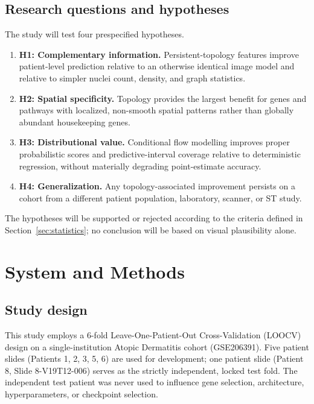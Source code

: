 \documentclass[nocrop]{bioinfo}
\begin{document}
\subsection{Research questions and hypotheses}

The study will test four prespecified hypotheses.

\begin{enumerate}
\item \textbf{H1: Complementary information.} Persistent-topology features
improve patient-level prediction relative to an otherwise identical image
model and relative to simpler nuclei count, density, and graph statistics.

\item \textbf{H2: Spatial specificity.} Topology provides the largest benefit
for genes and pathways with localized, non-smooth spatial patterns rather
than globally abundant housekeeping genes.

\item \textbf{H3: Distributional value.} Conditional flow modelling improves
proper probabilistic scores and predictive-interval coverage relative to
deterministic regression, without materially degrading point-estimate
accuracy.

\item \textbf{H4: Generalization.} Any topology-associated improvement
persists on a cohort from a different patient population, laboratory,
scanner, or ST study.
\end{enumerate}

The hypotheses will be supported or rejected according to the criteria
defined in Section~\ref{sec:statistics}; no conclusion will be based on visual
plausibility alone.

\section{System and Methods}

\subsection{Study design}

This study employs a 6-fold Leave-One-Patient-Out Cross-Validation (LOOCV) design on a single-institution Atopic Dermatitis cohort (GSE206391). Five patient slides (Patients 1, 2, 3, 5, 6) are used for development; one patient slide (Patient 8, Slide 8-V19T12-006) serves as the strictly independent, locked test fold. The independent test patient was never used to influence gene selection, architecture, hyperparameters, or checkpoint selection.
\end{document}
